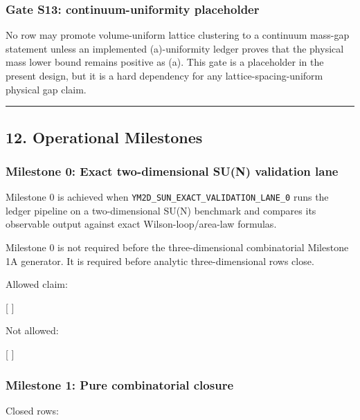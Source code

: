 \documentclass[
]{article}
\begin{document}
\subsubsection{Gate S13: continuum-uniformity
placeholder}\label{gate-s13-continuum-uniformity-placeholder}

No row may promote volume-uniform lattice clustering to a continuum
mass-gap statement unless an implemented (a)-uniformity ledger proves
that the physical mass lower bound remains positive as (a). This
gate is a placeholder in the present design, but it is a hard dependency
for any lattice-spacing-uniform physical gap claim.

\begin{center}\rule{0.5\linewidth}{0.5pt}\end{center}

\subsection{12. Operational Milestones}\label{operational-milestones}

\subsubsection{Milestone 0: Exact two-dimensional SU(N) validation
lane}\label{milestone-0-exact-two-dimensional-sun-validation-lane}

Milestone 0 is achieved when
\texttt{YM2D\_SUN\_EXACT\_VALIDATION\_LANE\_0} runs the ledger pipeline
on a two-dimensional SU(N) benchmark and compares its observable output
against exact Wilson-loop/area-law formulas.

Milestone 0 is not required before the three-dimensional combinatorial
Milestone 1A generator. It is required before analytic three-dimensional
rows close.

Allowed claim:

{[}
{]}

Not allowed:

{[} 
{]}

\subsubsection{Milestone 1: Pure combinatorial
closure}\label{milestone-1-pure-combinatorial-closure}

Closed rows:
\end{document}
